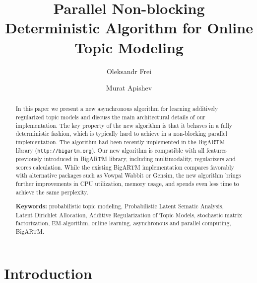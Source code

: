 \documentclass[russian,english]{llncs}
\begin{document}
\title{
    Parallel Non-blocking Deterministic Algorithm for Online Topic Modeling
}
\author{
    Oleksandr Frei
    \and
    Murat Apishev
}

\maketitle

\begin{abstract}
In this paper we present a new asynchronous algorithm for learning additively regularized topic models
and discuss the main architectural details of our implementation.
The key property of the new algorithm is that it behaves in a fully deterministic fashion,
which is typically hard to achieve in a non-blocking parallel implementation. The algorithm
had been
recently implemented in the BigARTM library (\texttt{http://bigartm.org}).
Our new algorithm is compatible with all features previously introduced in BigARTM library,
including multimodality, regularizers and scores calculation.
While the existing BigARTM implementation compares favorably
with alternative packages such as Vowpal Wabbit or Gensim,
the new algorithm brings further improvements in CPU utilization,
memory usage, and spends even less time to achieve the same perplexity.

\vspace{1em}
\textbf{Keywords:}
    probabilistic topic modeling,
    Probabilistic Latent Sematic Analysis,
    Latent Dirichlet Allocation,
    Additive Regularization of Topic Models,
    stochastic matrix factorization,
    EM-algorithm,
    online learning,
    asynchronous and parallel computing,
    BigARTM.
\end{abstract}

\section{Introduction}
%
\end{document}
